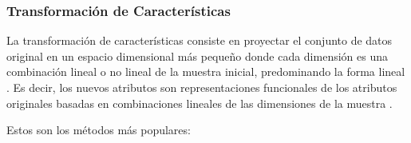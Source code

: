 \documentclass[10pt, a4paper]{article}
\begin{document}
\subsubsection{Transformación de Características}

La transformación de características consiste en proyectar el conjunto de datos original en un espacio dimensional más pequeño donde cada dimensión es una combinación lineal o no lineal de la muestra inicial, predominando la forma lineal \cite{Comparing and Combining Dimension Reduction Techniques for Efficient Text}. Es decir, los nuevos atributos son representaciones funcionales de los atributos originales basadas en combinaciones lineales de las dimensiones de la muestra \cite{survey text, A review of feature selection methods with applications}.   

Estos son los métodos más populares:
\end{document}
